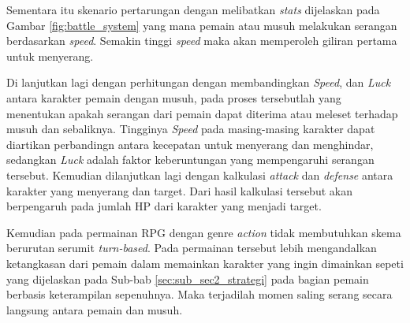 \begin{subs}
\begin{enumerate}[label=\textbf{\arabic*).}]
		Sementara itu skenario pertarungan dengan melibatkan \textit{stats} dijelaskan pada Gambar \ref{fig:battle_system} yang mana pemain atau musuh melakukan serangan berdasarkan \textit{speed}. Semakin tinggi \textit{speed} maka akan memperoleh giliran pertama untuk menyerang.
		\vspace{1ex}
		
		Di lanjutkan lagi dengan perhitungan dengan membandingkan \textit{Speed}, dan \textit{Luck} antara karakter pemain dengan musuh, pada proses tersebutlah yang menentukan apakah serangan dari pemain dapat diterima atau meleset terhadap musuh dan sebaliknya. Tingginya \textit{Speed} pada masing-masing karakter dapat diartikan perbandingn antara kecepatan untuk menyerang dan menghindar, sedangkan \textit{Luck} adalah faktor keberuntungan yang mempengaruhi serangan tersebut. Kemudian dilanjutkan lagi dengan kalkulasi \textit{attack} dan \textit{defense} antara karakter yang menyerang dan target. Dari hasil kalkulasi tersebut akan berpengaruh pada jumlah HP dari karakter yang menjadi target.
		\vspace{1ex}
		
		Kemudian pada permainan RPG dengan genre \textit{action} tidak membutuhkan skema berurutan serumit \textit{turn-based}. Pada permainan tersebut lebih mengandalkan ketangkasan dari pemain dalam memainkan karakter yang ingin dimainkan sepeti yang dijelaskan pada Sub-bab \ref{sec:sub_sec2_strategi} pada bagian pemain berbasis keterampilan sepenuhnya. Maka terjadilah momen saling serang secara langsung antara pemain dan musuh.
		\vspace{1ex}
		

\end{enumerate}
\end{subs}
